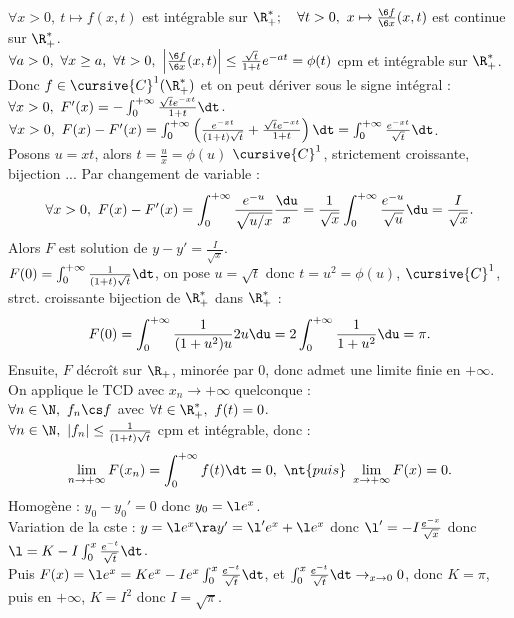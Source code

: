 \documentclass[11pt]{article}
\begin{document}
\begin{ex}{}{}
    $\forall x > 0, ~ t\mapsto f(x,t)$ est intégrable sur $\R_+^*; \quad \forall t > 0, ~ x\mapsto\frac{\6 f}{\6 x}(x,t)$ est continue sur $\R_+^*$.\\
    $\forall a > 0, ~ \forall x \geq a, ~ \forall t > 0, ~ \left|\frac{\6 f}{\6 x}(x,t)\right|\leq\frac{\sqrt{t}}{1+t}e^{-at}=\phi(t)$ cpm et intégrable sur $\R_+^*$.\\
    Donc $f\in\cursive{C}^1(\R_+^*)$ et on peut dériver sous le signe intégral : $\forall x > 0, ~ F'(x) = -\int_0^{+\infty}\frac{\sqrt{t}e^{-xt}}{1+t}\dt$.\\
     $\forall x > 0, ~ F(x) - F'(x) = \int_0^{+\infty}\left( \frac{e^{-xt}}{(1+t)\sqrt{t}} + \frac{\sqrt{t}e^{-xt}}{1+t} \right)\dt = \int_0^{+\infty}\frac{e^{-xt}}{\sqrt{t}}\dt$.\\
    Posons $u=xt$, alors $t=\frac{u}{x}=\phi(u)$ $\cursive{C}^1$, strictement croissante, bijection ... Par changement de variable :
    \begin{equation*}
        \forall x > 0, ~ F(x) - F'(x) = \int_0^{+\infty}\frac{e^{-u}}{\sqrt{u/x}}\frac{\du}{x} = \frac{1}{\sqrt{x}}\int_0^{+\infty}\frac{e^{-u}}{\sqrt{u}}\du=\frac{I}{\sqrt{x}}.
    \end{equation*}
    Alors $F$ est solution de $y-y'=\frac{I}{\sqrt{x}}$.\\
     $F(0)=\int_0^{+\infty}\frac{1}{(1+t)\sqrt{t}}\dt$, on pose $u=\sqrt{t}$ donc $t=u^2=\phi(u)$, $\cursive{C}^1$, strct. croissante bijection de $\R_+^*$ dans $\R_+^*$ :
    \begin{equation*}
        F(0) = \int_0^{+\infty}\frac{1}{(1+u^2)u}2u\du = 2\int_0^{+\infty}\frac{1}{1+u^2}\du = \pi.
    \end{equation*}
    Ensuite, $F$ décroît sur $\R_+$, minorée par 0, donc admet une limite finie en $+\infty$.\\
    On applique le TCD avec $x_n\to+\infty$ quelconque :\\
    $\forall n \in \N, ~ f_n \cs f$ avec $\forall t \in \R_+^*, ~ f(t)=0$.\\
    $\forall n \in \N, ~ |f_n|\leq\frac{1}{(1+t)\sqrt{t}}$ cpm et intégrable, donc :
    \begin{equation*}
        \lim_{n\to+\infty} F(x_n) = \int_0^{+\infty} f(t)\dt = 0, ~ \nt{puis} ~ \lim_{x\to+\infty}F(x)=0.
    \end{equation*}
     Homogène : $y_0-y_0'=0$ donc $y_0=\l e^x$.\\
    Variation de la cste : $y=\l e^x \ra y' = \l' e^x + \l e^x$ donc $\l' = -I\frac{e^{-x}}{\sqrt{x}}$ donc $\l=K-I\int_0^{x}\frac{e^{-t}}{\sqrt{t}}\dt$.\\
    Puis $F(x)=\l e^x = Ke^x - Ie^x\int_0^{x}\frac{e^{-t}}{\sqrt{t}}\dt$, et $\int_0^x\frac{e^{-t}}{\sqrt{t}}\dt\to_{x\to 0}0$, donc $K=\pi$, puis en $+\infty$, $K=I^2$ donc $I=\sqrt{\pi}$.
\end{ex}
\end{document}
